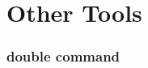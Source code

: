 \documentclass[a4paper,12pt,twoside]{book}
\begin{document}











\chapter{Other Tools}



\subsection{double command}
\end{document}
